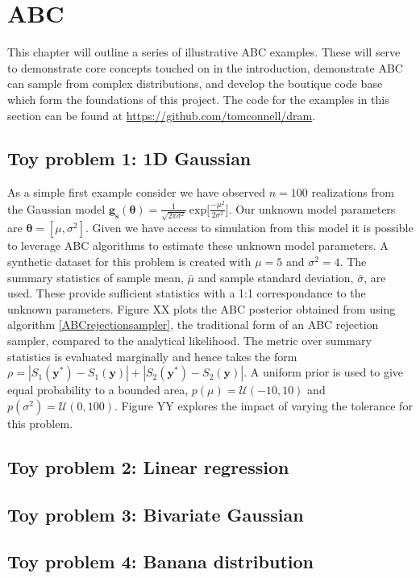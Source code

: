 \chapter{ABC}

This chapter will outline a series of illustrative ABC examples. These will serve to demonstrate core concepts touched on in the introduction, demonstrate ABC can sample from complex distributions, and develop the boutique code base which form the foundations of this project. The code for the examples in this section can be found at \url{https://github.com/tomconnell/dram}.\\

\section{Toy problem 1: 1D Gaussian}
As a simple first example consider we have observed $n = 100$ realizations from the Gaussian model $\bm{g_s}(\bm{\theta}) = \frac{1}{\sqrt{2\pi\sigma^2}}\ \text{exp}\Big[\frac{-\mu^2}{2\sigma^2}\Big]$. Our unknown model parameters are $\bm{\theta} = [\mu,\sigma^2]$. Given we have access to simulation from this model it is possible to leverage ABC algorithms to estimate these unknown model parameters. A synthetic dataset for this problem is created with $\mu = 5$ and $\sigma^2 = 4$. The summary statistics of sample mean, $\bar{\mu}$ and sample standard deviation, $\bar{\sigma}$, are used. These provide sufficient statistics with a 1:1 correspondance to the unknown parameters. Figure XX plots the ABC posterior obtained from using algorithm \ref{ABCrejectionsampler}, the traditional form of an ABC rejection sampler, compared to the analytical likelihood. The metric over summary statistics is evaluated marginally and hence takes the form $\rho = |S_1(\bm{y^*}) - S_1(\bm{y})| +| S_2(\bm{y^*}) - S_2(\bm{y})|$. A uniform prior is used to give equal probability to a bounded area, $p(\mu) = \mathcal{U}(-10,10)$ and $p(\sigma^2) = \mathcal{U}(0,100)$. 
Figure YY explores the impact of varying the tolerance for this problem.\\


\section{Toy problem 2: Linear regression}




\section{Toy problem 3: Bivariate Gaussian}




\section{Toy problem 4: Banana distribution}



 